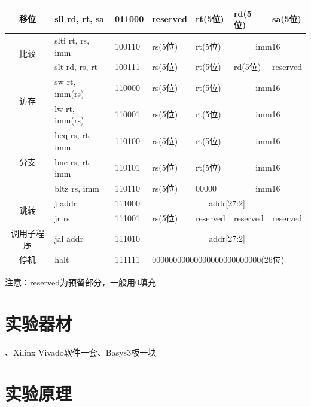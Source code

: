 \documentclass[12pt,UTF8]{ctexart}
\begin{document}
\begin{spacing}{1.1}
\begin{table}[H]
\begin{tabular}{|c|l|l|l|l|l|l|}
    \hline
    移位    & sll rd, rt, sa & 011000 & reserved & rt(5位) & rd(5位) & sa(5位) \\
    \hline
    \multirow{2}[4]{*}{比较} & slti rt, rs, imm & 100110 & rs(5位) & rt(5位) & \multicolumn{2}{c|}{imm16} \\
\cline{2-7}          & slt rd, rs, rt & 100111 & rs(5位) & rt(5位) & rd(5位) & \multicolumn{1}{c|}{reserved} \\
    \hline
    \multirow{2}[4]{*}{访存} & sw rt, imm(rs) & 110000 & rs(5位) & rt(5位) & \multicolumn{2}{c|}{imm16} \\
\cline{2-7}          & lw rt, imm(rs) & 110001 & rs(5位) & rt(5位) & \multicolumn{2}{c|}{imm16} \\
    \hline
    \multirow{3}[6]{*}{分支} & beq rs, rt, imm & 110100 & rs(5位) & rt(5位) & \multicolumn{2}{c|}{imm16} \\
\cline{2-7}          & bne rs, rt, imm & 110101 & rs(5位) & rt(5位) & \multicolumn{2}{c|}{imm16} \\
\cline{2-7}          & bltz rs, imm & 110110 & rs(5位) & 00000 & \multicolumn{2}{c|}{imm16} \\
    \hline
    \multirow{2}[4]{*}{跳转} & j addr & 111000 & \multicolumn{4}{c|}{addr[27:2]} \\
\cline{2-7}          & jr rs & 111001 & rs(5位) & reserved & reserved & reserved \\
    \hline
    调用子程序 & jal addr & 111010 & \multicolumn{4}{c|}{addr[27:2]} \\
    \hline
    停机    & halt  & 111111 & \multicolumn{4}{l|}{00000000000000000000000000(26位)} \\
    \hline
    \end{tabular}%
  \label{tab:mips_format}%
\end{table}%
\par 注意：reserved为预留部分，一般用0填充

\section{实验器材}
、Xilinx Vivado软件一套、Basys3板一块

\section{实验原理}


\end{spacing}
\end{document}
